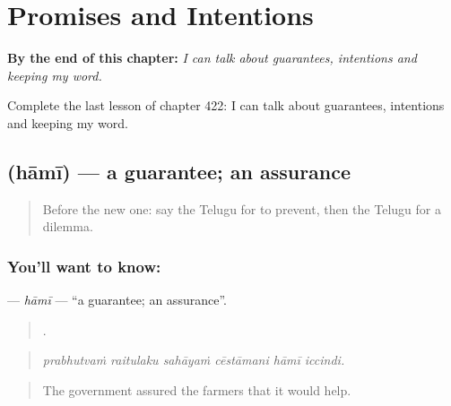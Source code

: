 
\chapter{Promises and Intentions}
\label{ch:te-promises-and-intentions}

\begin{chapteropening}
\textbf{By the end of this chapter:} \emph{I can talk about guarantees, intentions and keeping my word.}

Complete the last lesson of chapter 422: I can talk about guarantees, intentions and keeping my word.
\end{chapteropening}

\section[\texorpdfstring{\te{హామీ} (hāmī)}{హామీ (hāmī)}]{ (hāmī) — a guarantee; an assurance}

\label{lesson:TE-C422-hami}



\begin{quote}
Before the new one: say the Telugu for to prevent, then the Telugu for a dilemma.
\end{quote}

\subsection*{You'll want to know: }
\textbf{} — \emph{hāmī} — \textquotedblleft{}a guarantee; an assurance\textquotedblright{}.

\begin{quote}
     .
\end{quote}

\begin{quote}
\emph{prabhutvaṁ raitulaku sahāyaṁ cēstāmani hāmī iccindi.}
\end{quote}

\begin{quote}
The government assured the farmers that it would help.
\end{quote}

